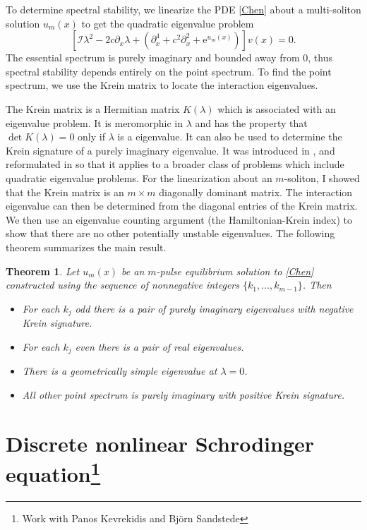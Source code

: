 \documentclass[12pt,reqno]{amsart}
\newtheorem{theorem}{Theorem}
\theoremstyle{definition}
\theoremstyle{remark}
\newcommand{\vK}{\bm{\mathit{K}}}
\begin{document}
To determine spectral stability, we linearize the PDE \eqref{Chen} about a multi-soliton solution $u_m(x)$ to get the quadratic eigenvalue problem
\[
[\mathcal{I} \lambda^2 -2 c \partial_x \lambda + (\partial_x^4 + c^2 \partial_x^2 + \mathrm{e}^{u_m(x)})]v(x) = 0.
\]
The essential spectrum is purely imaginary and bounded away from 0, thus spectral stability depends entirely on the point spectrum. To find the point spectrum, we use the Krein matrix to locate the interaction eigenvalues.

The Krein matrix is a Hermitian matrix $\vK(\lambda)$ which is associated with an eigenvalue problem. It is meromorphic in $\lambda$ and has the property that $\det\vK(\lambda)=0$ only if $\lambda$ is a eigenvalue. It can also be used to determine the Krein signature of a purely imaginary eigenvalue. It was introduced in \cite{Kapitula2013a}, and reformulated in \cite{Kap2019} so that it applies to a broader class of problems which include quadratic eigenvalue problems. For the linearization about an $m$-soliton, I showed that the Krein matrix is an $m \times m$ diagonally dominant matrix. The interaction eigenvalue can then be determined from the diagonal entries of the Krein matrix. We then use an eigenvalue counting argument (the Hamiltonian-Krein index) to show that there are no other potentially unstable eigenvalues. The following theorem summarizes the main result.

\begin{theorem}\label{Cheneigs}
Let $u_m(x)$ be an $m$-pulse equilibrium solution to \eqref{Chen} constructed using the sequence of nonnegative integers $\{ k_1, \dots, k_{m-1} \}$. Then
\begin{itemize}
\item For each $k_j$ odd there is a pair of purely imaginary eigenvalues with negative Krein signature.
\item For each $k_j$ even there is a pair of real eigenvalues.
\item There is a geometrically simple eigenvalue at $\lambda = 0$.
\item All other point spectrum is purely imaginary with positive Krein signature.
\end{itemize}
\end{theorem}

\section{Discrete nonlinear Schrodinger equation\footnote{Work with Panos Kevrekidis and Bj\"{o}rn Sandstede}}
\end{document}
